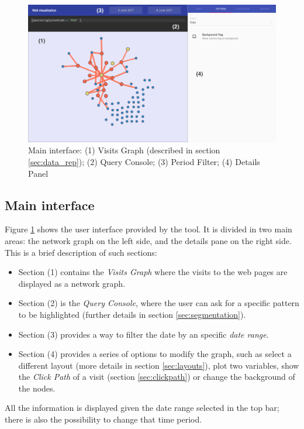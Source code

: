 \documentclass[preprint,12pt,3p]{elsarticle}
\begin{document}
\begin{figure}[h]
	\centering
	\includegraphics[width = \textwidth]{screenshots/app_main}
	\caption{
		Main interface: (1) Visits Graph (described in section \ref{sec:data_rep}); (2) Query Console; (3) Period Filter; (4) Details Panel
	}
	\label{fig:vizits}
\end{figure}

\subsection{Main interface}

Figure \ref{fig:vizits} shows the user interface provided by the tool. It is divided in two main areas: the network graph on the left side, and the details pane on the right side. This is a brief description of such sections:

\begin{itemize}
	\item Section (1) contains the \textit{Visits Graph} where the visits to the web pages are displayed as a network graph.
	\item Section (2) is the \textit{Query Console}, where the user can ask for a specific pattern to be highlighted (further details in section \ref{sec:segmentation}).
	\item Section (3) provides a way to filter the date by an specific \textit{date range}.
	\item Section (4) provides a series of options to modify the graph, such as select a different layout (more details in section \ref{sec:layouts}), plot two variables, show the \textit{Click Path} of a visit (section \ref{sec:clickpath}) or change the background of the nodes.
\end{itemize}


All the information is displayed given the date range selected in the top bar; there is also the possibility to change that time period.
\end{document}

